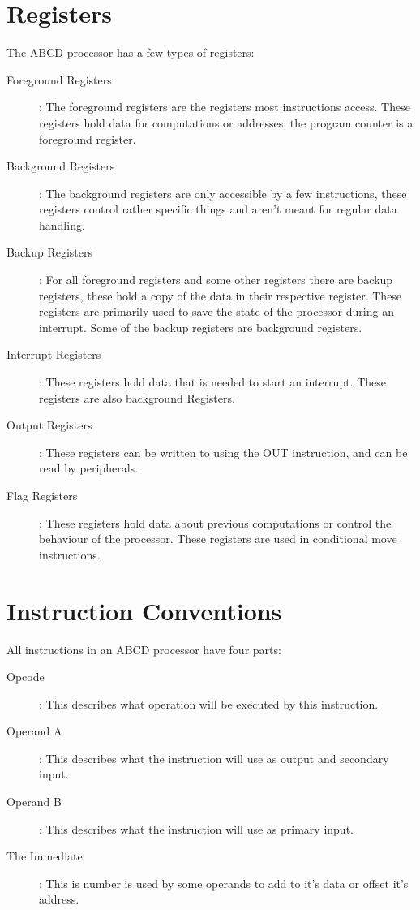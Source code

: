 \documentclass[oneside, a4paper]{memoir}
\begin{document}
\section{Registers}
The ABCD processor has a few types of registers:
\begin{description}
\item[Foreground Registers]: The foreground registers are the registers most instructions access. These registers hold data for computations or addresses, the program counter is a foreground register.
\item[Background Registers]: The background registers are only accessible by a few instructions, these registers control rather specific things and aren't meant for regular data handling.
\item[Backup Registers]: For all foreground registers and some other registers there are backup registers, these hold a copy of the data in their respective register. These registers are primarily used to save the state of the processor during an interrupt. Some of the backup registers are background registers.
\item[Interrupt Registers]: These registers hold data that is needed to start an interrupt. These registers are also background Registers.
\item[Output Registers]: These registers can be written to using the OUT instruction, and can be read by peripherals.
\item[Flag Registers]: These registers hold data about previous computations or control the behaviour of the processor. These registers are used in conditional move instructions.
\end{description}
\section{Instruction Conventions}
All instructions in an ABCD processor have four parts:
\begin{description}
\item[Opcode]: This describes what operation will be executed by this instruction.
\item[Operand A]: This describes what the instruction will use as output and secondary input.
\item[Operand B]: This describes what the instruction will use as primary input.
\item[The Immediate]: This is number is used by some operands to add to it's data or offset it's address.
\end{description}
\end{document}
